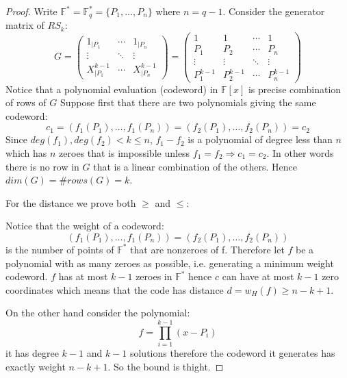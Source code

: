 \documentclass[11pt,a4paper]{report}
\theoremstyle{plain}
\theoremstyle{definition}
\begin{document}
\begin{thm-hand}[5.1.1]
\end{thm-hand}
\begin{proof}
Write $\mathbb{F}^* = \mathbb{F}_q^* = \{P_1,\ldots, P_n\}$ where $n = q-1$. 
Consider the generator matrix of $RS_k$:
\[
G = \begin{pmatrix}
  1_{|P_1}  & \cdots & 1_{|P_n} \\
  \vdots & \ddots & \vdots  \\
  X_{|P_1}^{k-1}  & \cdots & X_{|P_n}^{k-1} 
 \end{pmatrix} = 
 \begin{pmatrix}
  1  & 1 & \cdots & 1 \\
  P_1 & P_2 & \cdots & P_n\\
  \vdots &\vdots& \ddots & \vdots  \\
  P_1^{k-1} & P_2^{k-1} & \cdots & P_n^{k-1} 
 \end{pmatrix}
\]
Notice that a polynomial evaluation (codeword) in $\mathbb{F}[x]$ is precise combination of rows of $G$
Suppose first that there are two polynomials giving the same codeword:
\[
	c_1 = (f_1(P_1),\ldots, f_1(P_n)) = (f_2(P_1),\ldots, f_2(P_n)) = c_2
\]
Since $deg(f_1),deg(f_2) < k \le n$, $f_1 - f_2$ is a polynomial of degree less than $n$ which has $n$ zeroes that is impossible unless $f_1 = f_2 \Rightarrow c_1 = c_2$. In other words there is no row in $G$ that is a linear combination of the others. Hence $dim(G) = \#rows(G) = k$.

For the distance we prove both $\ge$ and $\le$:

Notice that the weight of a codeword:
\[
	(f_1(P_1),\ldots, f_1(P_n)) = (f_2(P_1),\ldots, f_2(P_n))
\]
	is the number of points of $\mathbb{F}^*$ that are nonzeroes of f. Therefore let $f$ be a polynomial with as many zeroes as possible, i.e. generating a minimum weight codeword. $f$ has at most $k-1$ zeroes in $\mathbb{F}^*$ hence $c$ can have at most $k-1$ zero coordinates which means that the code has distance $d = w_H(f) \ge n - k +1$.

On the other hand consider the polynomial:
\[
	f = \prod\limits_{i = 1}^{k-1}(x - P_i)
\]
it has degree $k-1$ and $k-1$ solutions therefore the codeword it generates has exactly weight $n-k+1$. So the bound is thight.
\end{proof}
\end{document}
